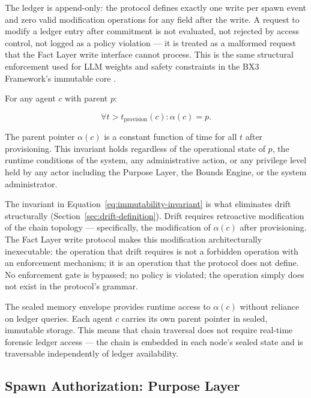 The ledger is append-only: the protocol defines exactly one write per spawn event and zero valid modification operations for any field after the write. A request to modify a ledger entry after commitment is not evaluated, not rejected by access control, not logged as a policy violation — it is treated as a malformed request that the Fact Layer write interface cannot process. This is the same structural enforcement used for LLM weights and safety constraints in the BX3 Framework's immutable core \cite{bx3whitepaper2026}.

\begin{dfn}
\label{dfn:fact-layer-immutability}
For any agent $c$ with parent $p$:

\begin{equation}
\label{eq:immutability-invariant}
\forall t > t_{\text{provision}}(c): \alpha(c) = p.
\end{equation}

The parent pointer $\alpha(c)$ is a constant function of time for all $t$ after provisioning. This invariant holds regardless of the operational state of $p$, the runtime conditions of the system, any administrative action, or any privilege level held by any actor including the Purpose Layer, the Bounds Engine, or the system administrator.
\end{dfn}

The invariant in Equation~\ref{eq:immutability-invariant} is what eliminates drift structurally (Section~\ref{sec:drift-definition}). Drift requires retroactive modification of the chain topology — specifically, the modification of $\alpha(c)$ after provisioning. The Fact Layer write protocol makes this modification architecturally inexecutable: the operation that drift requires is not a forbidden operation with an enforcement mechanism; it is an operation that the protocol does not define. No enforcement gate is bypassed; no policy is violated; the operation simply does not exist in the protocol's grammar.

The sealed memory envelope provides runtime access to $\alpha(c)$ without reliance on ledger queries. Each agent $c$ carries its own parent pointer in sealed, immutable storage. This means that chain traversal does not require real-time forensic ledger access — the chain is embedded in each node's sealed state and is traversable independently of ledger availability.

\subsection{Spawn Authorization: Purpose Layer}
\label{sec:purpose-layer-spawn-authorization}

